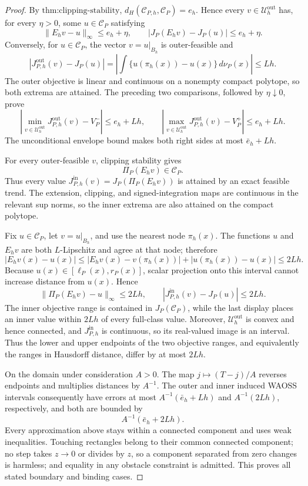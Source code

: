 \documentclass{article}
\begin{document}
\begin{proof}
By \(\text{thm:clipping-stability}\), \(d_H(\mathcal C_{P,h},\mathcal C_P)=e_h\).  Hence every \(v\in\mathcal U_h^{\mathrm{out}}\) has, for every \(\eta>0\), some \(u\in\mathcal C_P\) satisfying
\[
 \|E_hv-u\|_\infty\leq e_h+\eta,
 \qquad
 |J_P(E_hv)-J_P(u)|\leq e_h+\eta.
\]
Conversely, for \(u\in\mathcal C_P\), the vector \(v=u|_{B_h}\) is outer-feasible and
\[
 |J_{P,h}^{\mathrm{out}}(v)-J_P(u)|
 =\left|\int\{u(\pi_h(x))-u(x)\}\,d\nu_P(x)\right|
 \leq Lh.
\]
The outer objective is linear and continuous on a nonempty compact polytope, so both extrema are attained.  The preceding two comparisons, followed by \(\eta\downarrow0\), prove
\[
 \left|\min_{v\in\mathcal U_h^{\mathrm{out}}}J_{P,h}^{\mathrm{out}}(v)-V_P^-\right|
 \leq e_h+Lh,
 \qquad
 \left|\max_{v\in\mathcal U_h^{\mathrm{out}}}J_{P,h}^{\mathrm{out}}(v)-V_P^+\right|
 \leq e_h+Lh.
\]
The unconditional envelope bound makes both right sides at most \(\bar e_h+Lh\).

For every outer-feasible \(v\), clipping stability gives
\[
 \Pi_P(E_hv)\in\mathcal C_P.
\]
Thus every value \(J_{P,h}^{\mathrm{in}}(v)=J_P(\Pi_P(E_hv))\) is attained by an exact feasible trend.  The extension, clipping, and signed-integration maps are continuous in the relevant sup norms, so the inner extrema are also attained on the compact polytope.

Fix \(u\in\mathcal C_P\), let \(v=u|_{B_h}\), and use the nearest node \(\pi_h(x)\).  The functions \(u\) and \(E_hv\) are both \(L\)-Lipschitz and agree at that node; therefore
\[
 |E_hv(x)-u(x)|
 \leq|E_hv(x)-v(\pi_h(x))|+|u(\pi_h(x))-u(x)|
 \leq2Lh.
\]
Because \(u(x)\in[\ell_P(x),r_P(x)]\), scalar projection onto this interval cannot increase distance from \(u(x)\).  Hence
\[
 \|\Pi_P(E_hv)-u\|_\infty\leq2Lh,
 \qquad
 |J_{P,h}^{\mathrm{in}}(v)-J_P(u)|\leq2Lh.
\]
The inner objective range is contained in \(J_P(\mathcal C_P)\), while the last display places an inner value within \(2Lh\) of every full-class value.  Moreover, \(\mathcal U_h^{\mathrm{out}}\) is convex and hence connected, and \(J_{P,h}^{\mathrm{in}}\) is continuous, so its real-valued image is an interval.  Thus the lower and upper endpoints of the two objective ranges, and equivalently the ranges in Hausdorff distance, differ by at most \(2Lh\).

On the domain under consideration \(A>0\).  The map \(j\mapsto(T-j)/A\) reverses endpoints and multiplies distances by \(A^{-1}\).  The outer and inner induced WAOSS intervals consequently have errors at most \(A^{-1}(\bar e_h+Lh)\) and \(A^{-1}(2Lh)\), respectively, and both are bounded by
\[
 A^{-1}(\bar e_h+2Lh).
\]
Every approximation above stays within a connected component and uses weak inequalities.  Touching rectangles belong to their common connected component; no step takes \(z\to0\) or divides by \(z\), so a component separated from zero changes is harmless; and equality in any obstacle constraint is admitted.  This proves all stated boundary and binding cases.
\end{proof}
\end{document}

